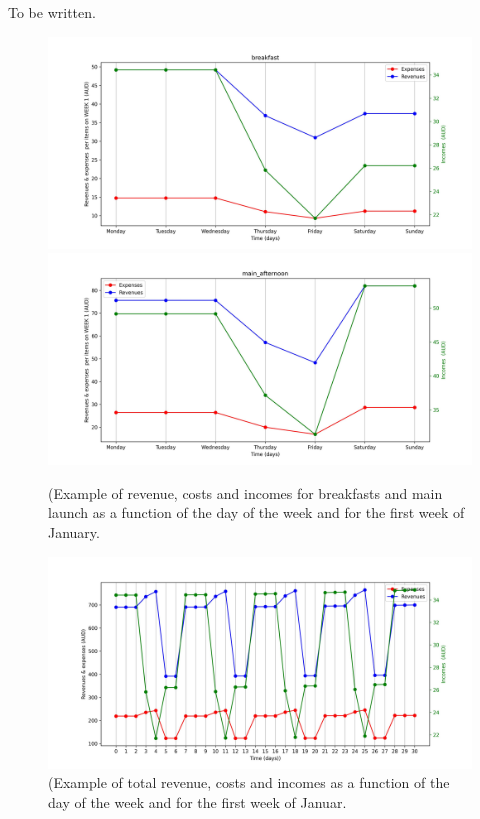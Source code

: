 \documentclass{article}
\begin{document}
To be written.
 \begin{figure}
 \begin{center}
\includegraphics[angle=0, scale=0.5]{graphics/Fig_breakfast.jpg}
\includegraphics[angle=0, scale=0.5]{graphics/Fig_main_afternoon.jpg}
\caption{(Example of revenue, costs and incomes for breakfasts and main launch as a function of the day of the week and for the first week of January.}
\end{center}
\end{figure}

 \begin{figure}
 \begin{center}
\includegraphics[angle=0, scale=0.5]{graphics/Fig_Jan.jpg}
\caption{(Example of total revenue, costs and incomes as a function of the day of the week and for the first week of Januar.}
\end{center}
\end{figure}
\end{document}
